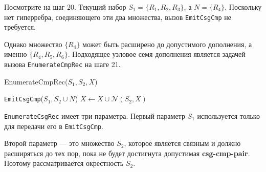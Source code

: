 \documentclass[12pt]{article}
\begin{document}
\begin{flushleft}
\begin{center}
\end{center}

Посмотрите на шаг 20.  
Текущий набор $S_1 = \{R_1, R_2, R_3\}$, а $N = \{R_4\}$.  
Поскольку нет гиперребра, соединяющего эти два множества,  
вызов \texttt{EmitCsgCmp} не требуется.  

Однако множество $\{R_4\}$ может быть расширено  
до допустимого дополнения, а именно $\{R_4, R_5, R_6\}$.  
Подходящее узловое семя дополнения является задачей вызова  
\texttt{EnumerateCmpRec} на шаге 21.  

\begin{algorithm}
    EnumerateCmpRec($S_1, S_2, X$)
    \begin{algorithmic}[1]
                \State \texttt{EmitCsgCmp}($S_1, S_2 \cup N$)
            \EndIf
        \EndFor
        \State $X \gets X \cup \mathcal{N}(S_2, X)$
            \State {}
        \EndFor
    \end{algorithmic}
\end{algorithm}

\texttt{EnumerateCsgRec} имеет три параметра.  
Первый параметр $S_1$ используется только для передачи его в \texttt{EmitCsgCmp}.  

Второй параметр — это множество $S_2$,  
которое является связным и должно расширяться до тех пор,  
пока не будет достигнута допустимая \textbf{csg-cmp-pair}.  
Поэтому рассматривается окрестность $S_2$.  


\end{flushleft}
\end{document}
